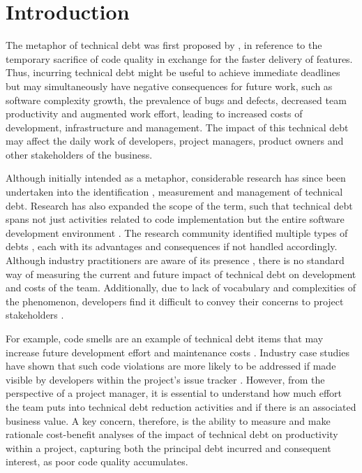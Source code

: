 \section{Introduction}
\label{introduction}

The metaphor of technical debt was first proposed by \cite{Cunningham1993}, in
reference to the temporary sacrifice of code quality in exchange for the faster
delivery of features. Thus, incurring technical debt might be useful to achieve
immediate deadlines but may simultaneously have negative consequences for future
work, such as software complexity growth, the prevalence of bugs and defects,
decreased team productivity and augmented work effort, leading to increased
costs of development, infrastructure and management. The impact of this
technical debt may affect the daily work of developers, project managers,
product owners and other stakeholders of the business.

Although initially intended as a metaphor, considerable research has since been
undertaken into the identification \cite{Lim2012}, measurement \cite{Fontana2016} and
management \cite{Codabux2013} of technical debt.  Research has also expanded the
scope of the term, such that technical debt spans not just activities related to
code implementation but the entire software development environment
\cite{Power2013}. The research community identified multiple types of debts
\cite{Li2015}, each with its advantages and consequences if not handled
accordingly. Although industry practitioners are aware of its presence
\cite{Codabux2013} \cite{Lim2012}, there is no standard way of measuring the
current and future impact of technical debt on development and costs of the
team. Additionally, due to lack of vocabulary and complexities of the
phenomenon, developers find it difficult to convey their concerns to project
stakeholders \cite{Kruchten2012}.

For example, code smells are an example of technical debt items that may
increase future development effort and maintenance costs \cite{Fowler1999}.
Industry case studies have shown that such code violations are more likely to be
addressed if made visible by developers within the project's issue tracker
\cite{Lim2012}.  However, from the perspective of a project manager, it is
essential to understand how much effort the team puts into technical debt
reduction activities and if there is an associated business value.  A key
concern, therefore, is the ability to measure and make rationale cost-benefit
analyses of the impact of technical debt on productivity within a project,
capturing both the principal debt incurred and consequent interest, as poor code
quality accumulates.

